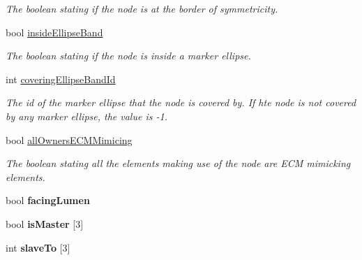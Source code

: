 \begin{DoxyCompactItemize}
\begin{DoxyCompactList}\small\item\em The boolean stating if the node is at the border of symmetricity. \end{DoxyCompactList}\item 
\hypertarget{classNode_a216c4bf4af00dc77d8c88c4d2952f6ab}{}bool \hyperlink{classNode_a216c4bf4af00dc77d8c88c4d2952f6ab}{inside\+Ellipse\+Band}\label{classNode_a216c4bf4af00dc77d8c88c4d2952f6ab}

\begin{DoxyCompactList}\small\item\em The boolean stating if the node is inside a marker ellipse. \end{DoxyCompactList}\item 
\hypertarget{classNode_a5a0c478d6925dc16abf3995061fda191}{}int \hyperlink{classNode_a5a0c478d6925dc16abf3995061fda191}{covering\+Ellipse\+Band\+Id}\label{classNode_a5a0c478d6925dc16abf3995061fda191}

\begin{DoxyCompactList}\small\item\em The id of the marker ellipse that the node is covered by. If hte node is not covered by any marker ellipse, the value is -\/1. \end{DoxyCompactList}\item 
\hypertarget{classNode_aa9eb82543b868adc05b5543251ebb42f}{}bool \hyperlink{classNode_aa9eb82543b868adc05b5543251ebb42f}{all\+Owners\+E\+C\+M\+Mimicing}\label{classNode_aa9eb82543b868adc05b5543251ebb42f}

\begin{DoxyCompactList}\small\item\em The boolean stating all the elements making use of the node are E\+C\+M mimicking elements. \end{DoxyCompactList}\item 
\hypertarget{classNode_a377cb501b279a025c1c53f24572ed415}{}bool {\bfseries facing\+Lumen}\label{classNode_a377cb501b279a025c1c53f24572ed415}

\item 
\hypertarget{classNode_af96140b8fa2e7abffd79a040c6972309}{}bool {\bfseries is\+Master} \mbox{[}3\mbox{]}\label{classNode_af96140b8fa2e7abffd79a040c6972309}

\item 
\hypertarget{classNode_a83aeb69143ee2ddc1f6f49be4b261b44}{}int {\bfseries slave\+To} \mbox{[}3\mbox{]}\label{classNode_a83aeb69143ee2ddc1f6f49be4b261b44}


\end{DoxyCompactItemize}
